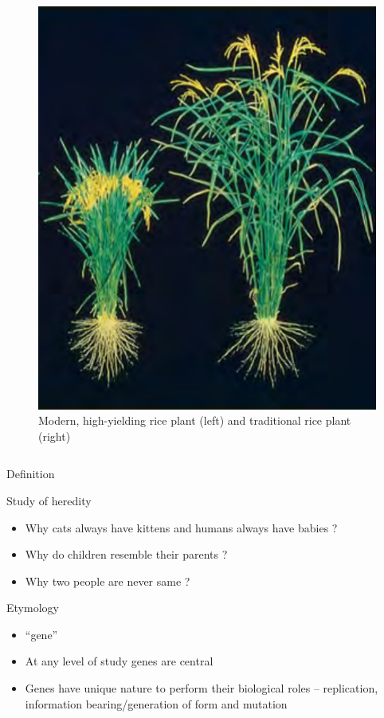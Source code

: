 \documentclass[11pt,ignorenonframetext,aspectratio=169]{beamer}
\providecommand{\tightlist}{%
  \setlength{\itemsep}{0pt}\setlength{\parskip}{0pt}}
\begin{document}
\begin{frame}{}
\begin{columns}[T,onlytextwidth]
\begin{figure}
\includegraphics[width=0.8\linewidth]{../images/green_revolution_crop} \caption{Modern, high-yielding rice plant (left) and traditional rice plant (right)}\label{fig:green-revolution-crop}
\end{figure}

\end{columns}
\end{frame}

\begin{frame}{Definition}
\protect\hypertarget{definition}{}
\begin{block}{Study of heredity}
\protect\hypertarget{study-of-heredity}{}
\begin{itemize}
\tightlist
\item
  Why cats always have kittens and humans always have babies ?
\item
  Why do children resemble their parents ?
\item
  Why two people are never same ?
\end{itemize}
\end{block}

\begin{block}{Etymology}
\protect\hypertarget{etymology}{}
\begin{itemize}
\tightlist
\item
  ``gene''
\item
  At any level of study genes are central
\item
  Genes have unique nature to perform their biological roles --
  replication, information bearing/generation of form and mutation
\end{itemize}
\end{block}
\end{frame}
\end{document}
